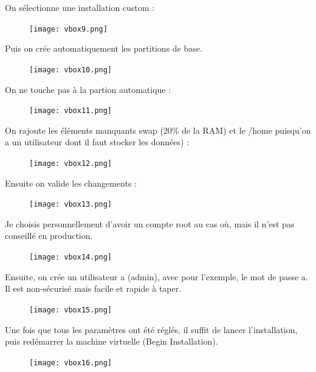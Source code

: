 \documentclass{article}
\begin{document}
On sélectionne une installation custom :

\begin{figure}[h!]
		\centering
		\texttt{[image: vbox9.png]}
\end{figure}

Puis on crée automatiquement les partitions de base.

\begin{figure}[h!]
		\centering
		\texttt{[image: vbox10.png]}
\end{figure}

\pagebreak
On ne touche pas à la partion automatique : 

\begin{figure}[h!]
		\centering
		\texttt{[image: vbox11.png]}
\end{figure}

 On rajoute les éléments manquants swap (20\% de la RAM) et le /home puisqu'on a un utilisateur dont il faut stocker les données) :
\begin{figure}[h!]
		\centering
		\texttt{[image: vbox12.png]}
\end{figure}

\pagebreak

Ensuite on valide les changements :

\begin{figure}[h!]
		\centering
		\texttt{[image: vbox13.png]}
\end{figure}


Je choisis personnellement d'avoir un compte root au cas où, mais il n'est pas conseillé en production.

\begin{figure}[h!]
		\centering
		\texttt{[image: vbox14.png]}
\end{figure}

\pagebreak

Ensuite, on crée un utilisateur a (admin), avec pour l'exemple, le mot de passe a. Il est non-sécurisé mais facile et rapide à taper.

\begin{figure}[h!]
		\centering
		\texttt{[image: vbox15.png]}
\end{figure}

Une fois que tous les paramètres ont été réglés, il suffit de lancer l'installation, puis redémarrer la machine virtuelle (Begin Installation).

\begin{figure}[h!]
		\centering
		\texttt{[image: vbox16.png]}
\end{figure}
\end{document}
